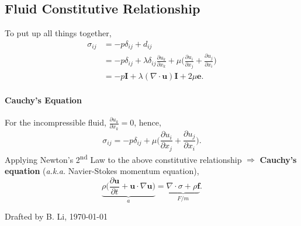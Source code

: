 \documentclass[a4paper]{article}
\begin{document}
\subsection{Fluid Constitutive Relationship}
\vspace{-.3cm}
To put up all things together,
\begin{align*}
    \sigma_{ij} 
    & = -p\delta_{ij} + d_{ij} \\
    & = -p\delta_{ij} + \lambda \delta_{ij} \frac{\partial u_{k}}{\partial x_{k}}+ \mu \bigg(\frac{\partial u_{i}}{\partial x_{j}} + \frac{\partial u_{j}}{\partial x_{i}}\bigg) \\
    & = -p\mathbf{I} + \lambda (\nabla \cdot \mathbf{u})\mathbf{I} + 2\mu \mathbf{e}.
\end{align*}

\paragraph{Cauchy's Equation} For the incompressible fluid, $\frac{\partial u_k}{\partial x_k} = 0$, hence,
\[
    \sigma_{ij} = -p\delta_{ij} + \mu \bigg(\frac{\partial u_{i}}{\partial x_{j}} + \frac{\partial u_{j}}{\partial x_{i}}\bigg).
\]
Applying Newton's 2\textsuperscript{nd} Law to the above constitutive relationship $\Rightarrow$ \textbf{Cauchy's equation} (\textit{a.k.a.} Navier-Stokes momentum equation),
\[  
    \underbrace{\rho \bigg(\frac{\partial \mathbf{u}}{\partial t} + \mathbf{u} \cdot \nabla \mathbf{u} \bigg)}_{a} = \underbrace{\nabla \cdot \sigma + \rho \mathbf{f}}_{F/m}.
\]



\vfill
{\small \color{gray}Drafted by B. Li, \today}

\end{document}
